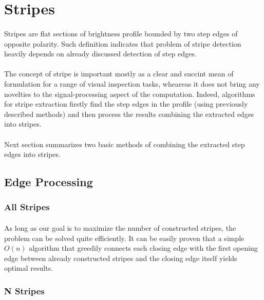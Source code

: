 \section{Stripes}

\paragraph*{}
Stripes are flat sections of brightness profile bounded by two step edges of opposite polarity. Such definition indicates that problem of stripe detection heavily depends on already discussed detection of step edges. 

\paragraph*{}
The concept of stripe is important mostly as a clear and succint mean of formulation for a range of visual inspection tasks, wheareas it does not bring any novelties to the signal-processing aspect of the computation. Indeed, algorithms for stripe extraction firstly find the step edges in the profile (using previously described methods) and then process the results combining the extracted edges into stripes. 

\paragraph*{}
Next section summarizes two basic methods of combining the extracted step edges into stripes.

\subsection{Edge Processing}

\subsubsection{All Stripes}

\paragraph*{} As long as our goal is to maximize the number of constructed stripes, the problem can be solved quite efficiently. It can be easily proven that a simple $O(n)$ algorithm that greedily connects each closing edge with the first opening edge between already constructed stripes and the closing edge itself yields optimal results.

\subsubsection{N Stripes}

